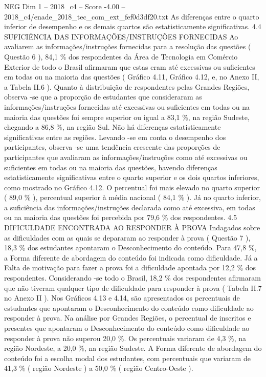 \begin{textsample}{NEG Dim 1 – 2018\_c4 – Score -4.00 – 2018\_c4/enade\_2018\_tec\_com\_ext\_fef0d3df20.txt}
As diferenças entre o quarto inferior de desempenho e os demais quartos são estatisticamente significativas. 4.4 SUFICIÊNCIA DAS INFORMAÇÕES/INSTRUÇÕES FORNECIDAS Ao avaliarem as informações/instruções fornecidas para a resolução das questões ( Questão 6 ), 84,1 \% dos respondentes da Área de Tecnologia em Comércio Exterior de todo o Brasil afirmaram que estas eram até excessivas ou suficientes em todas ou na maioria das questões ( Gráfico 4.11, Gráfico 4.12, e, no Anexo II, a Tabela II.6 ).
Quanto à distribuição de respondentes pelas Grandes Regiões, observa -se que a proporção de estudantes que consideraram as informações/instruções fornecidas até excessivas ou suficientes em todas ou na maioria das questões foi sempre superior ou igual a 83,1 \%, na região Sudeste, chegando a 86,8 \%, na região Sul.
Não há diferenças estatisticamente significativas entre as regiões.
Levando -se em conta o desempenho dos participantes, observa -se uma tendência crescente das proporções de participantes que avaliaram as informações/instruções como até excessivas ou suficientes em todas ou na maioria das questões, havendo diferenças estatisticamente significativas entre o quarto superior e os dois quartos inferiores, como mostrado no Gráfico 4.12.
O percentual foi mais elevado no quarto superior ( 89,0 \% ), percentual superior à média nacional ( 84,1 \% ).
Já no quarto inferior, a suficiência das informações/instruções declarada como até excessiva, em todas ou na maioria das questões foi percebida por 79,6 \% dos respondentes. 4.5 DIFICULDADE ENCONTRADA AO RESPONDER À PROVA Indagados sobre as dificuldades com as quais se depararam ao responder à prova ( Questão 7 ), 18,3 \% dos estudantes apontaram o Desconhecimento do conteúdo.
Para 47,8 \%, a Forma diferente de abordagem do conteúdo foi indicada como dificuldade.
Já a Falta de motivação para fazer a prova foi a dificuldade apontada por 12,2 \% dos respondentes.
Considerando -se todo o Brasil, 18,2 \% dos respondentes afirmaram que não tiveram qualquer tipo de dificuldade para responder à prova ( Tabela II.7 no Anexo II ).
Nos Gráficos 4.13 e 4.14, são apresentados os percentuais de estudantes que apontaram o Desconhecimento do conteúdo como dificuldade ao responder à prova.
Na análise por Grandes Regiões, o percentual de inscritos e presentes que apontaram o Desconhecimento do conteúdo como dificuldade ao responder à prova não superou 20,0 \%.
Os percentuais variaram de 4,3 \%, na região Nordeste, a 20,0 \%, na região Sudeste.
A Forma diferente de abordagem do conteúdo foi a escolha modal dos estudantes, com percentuais que variaram de 41,3 \% ( região Nordeste ) a 50,0 \% ( região Centro-Oeste ).

\end{textsample}
